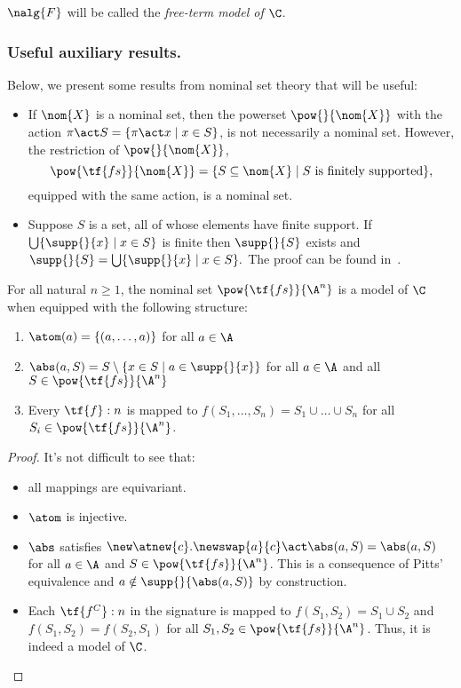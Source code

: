 $\nalg{F}$ will be called the {\em free-term model of $\C$}.

\subsubsection*{Useful auxiliary results.}
Below, we present some results from nominal set theory that will be useful:

\begin{itemize}
    \item If $\nom{X}$ is a nominal set, then the powerset $\pow{}{\nom{X}}$ with the action $\pi\act S = \{\pi\act x \mid x \in S\}$, is not necessarily a nominal set. However, the restriction of $\pow{}{\nom{X}}$,
    \[
         \pow{\tf{fs}}{\nom{X}} = \{S\subseteq \nom{X} \mid \text{$S$ is finitely supported}\},
    \]
    equipped with the same action, is a nominal set.

    \item Suppose $S$ is a set, all of whose elements have finite support. If $\bigcup \{\supp{}{x} \mid x\in S\}$ is finite then $\supp{}{S}$ exists and
    \(
        \supp{}{S} = \bigcup \{\supp{}{x} \mid x\in S\}.
    \)
    The proof can be found in~\cite{DBLP:journals/bsl/Gabbay11}.
\end{itemize}

\begin{lemma}\label{lemma:power-set-algebra}
    For all natural $n\geq 1$, the nominal set $\pow{\tf{fs}}{\A^n}$ is a model of $\C$ when equipped with the following structure:
\begin{enumerate}
    \item $\atom(a) = \{(a,\ldots,a)\}$ for all $a\in\A$

    \item $ \abs(a,S) = S\setminus\{x\in S\mid a\in\supp{}{x}\}$ for all $a\in\A$ and all $S\in \pow{\tf{fs}}{\A^n}$

    \item Every $\tf{f}:n$ is mapped to $f(S_1,\ldots,S_n) = S_1\cup\ldots\cup S_n$ for all $S_i\in  \pow{\tf{fs}}{\A^n}$.
\end{enumerate}
\end{lemma}

\begin{proof}
    It's not difficult to see that:
   \begin{itemize}
       \item all mappings are equivariant.
       \item $\atom$ is injective.
       \item $\abs$ satisfies $\new\atnew{c}.\newswap{a}{c}\act\abs(a,S) = \abs(a,S)$ for all $a\in\A$ and $S\in  \pow{\tf{fs}}{\A^n}$. This is a consequence of Pitts' equivalence and $a\notin \supp{}{\abs(a,S)}$ by construction.
       \item Each $\tf{f^C}:n$ in the signature is mapped to $f(S_1,S_2) = S_1\cup S_2$ and $f(S_1,S_2) = f(S_2,S_1)$  for all $S_1,S_2\in  \pow{\tf{fs}}{\A^n}$. Thus, it is indeed a model of $\C$.
   \end{itemize}
\end{proof}

